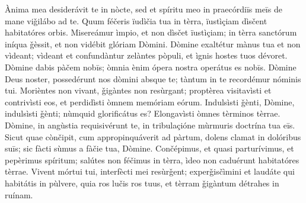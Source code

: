 Ànima mea desiderávit te in nòcte, sed et spíritu meo in praecórdiīs meīs de mane viǧilábo ad te. Quum féčeris ïudìčia tua in tèrra, ïustìçiam dìsčent habitatóres orbis.
Misereámur ìmpio, et non dìsčet ïustìçiam; in tèrra sanctórum iníqua ǧèssit, et non vidébit glóriam Dòmini.
Dòmine exaltétur mànus tua et non vìdeant; vìdeant et confundàntur zelàntes pòpuli, et ìgnis hostes tuos dévoret.
Dòmine dabis pàčem nobīs; òmnia ènim ópera nostra operátus es nobīs.
Dòmine Deus noster, possedérunt nos dòmini absque te; tàntum in te recordémur nóminis tui.
Morièntes non vivant, ǧigàntes non resùrgant; proptèrea visitavìsti et contrivìsti eos, et perdidìsti òmnem memóriam eórum.
Indulsìsti ǧènti, Dòmine, indulsìsti ǧènti; nùmquid glorificátus es? Elongavìsti òmnes tèrminos tèrrae.
Dòmine, in angùstia requisivérunt te, in tribulaçióne mùrmuris doctrína tua eīs.
Sicut quae cònčipit, cum appropinquáverit ad pàrtum, dolens clamat in dolóribus suīs; sic fàcti sùmus a fàčie tua, Dòmine.
Cončépimus, et quasi parturívimus, et pepèrimus spíritum; salútes non féčimus in tèrra, ìdeo non caduérunt habitatóres tèrrae.
Vivent mórtui tui, interfècti mei resùrǧent; experǧisčìmini et laudáte qui habitátis in pùlvere, quia ros lučis ros tuus, et tèrram ǧigàntum détrahes in ruínam.
